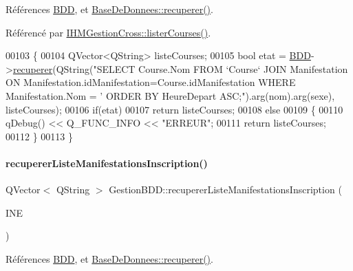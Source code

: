 Références \hyperlink{class_gestion_b_d_d_a1bd17cbf5754eb6e54ae351f1d02dca2}{B\+DD}, et \hyperlink{class_base_de_donnees_a77539baad389f5acf754cd2cd452403e}{Base\+De\+Donnees\+::recuperer()}.



Référencé par \hyperlink{class_i_h_m_gestion_cross_a34567afe3e94862ebd9af51528dedb65}{I\+H\+M\+Gestion\+Cross\+::lister\+Courses()}.


\begin{DoxyCode}
00103 \{
00104     QVector<QString> listeCourses;
00105     \textcolor{keywordtype}{bool} etat = \hyperlink{class_gestion_b_d_d_a1bd17cbf5754eb6e54ae351f1d02dca2}{BDD}->\hyperlink{class_base_de_donnees_a77539baad389f5acf754cd2cd452403e}{recuperer}(QString(\textcolor{stringliteral}{"SELECT Course.Nom FROM `Course` JOIN Manifestation ON
       Manifestation.idManifestation=Course.idManifestation WHERE Manifestation.Nom = '%
       ORDER BY HeureDepart ASC;"}).arg(nom).arg(sexe), listeCourses);
00106     \textcolor{keywordflow}{if}(etat)
00107         \textcolor{keywordflow}{return} listeCourses;
00108     \textcolor{keywordflow}{else}
00109     \{
00110         qDebug() << Q\_FUNC\_INFO << \textcolor{stringliteral}{"ERREUR"};
00111         \textcolor{keywordflow}{return} listeCourses;
00112     \}
00113 \}
\end{DoxyCode}
\mbox{\label{class_gestion_b_d_d_a6c1ab5e51fbd6c92bb096badbeac0df5}} 
\paragraph{\texorpdfstring{recuperer\+Liste\+Manifestations\+Inscription()}{recupererListeManifestationsInscription()}}
{\footnotesize\ttfamily Q\+Vector$<$ Q\+String $>$ Gestion\+B\+D\+D\+::recuperer\+Liste\+Manifestations\+Inscription (\begin{DoxyParamCaption}\item[{Q\+String}]{I\+NE }\end{DoxyParamCaption})}



Références \hyperlink{class_gestion_b_d_d_a1bd17cbf5754eb6e54ae351f1d02dca2}{B\+DD}, et \hyperlink{class_base_de_donnees_a77539baad389f5acf754cd2cd452403e}{Base\+De\+Donnees\+::recuperer()}.



